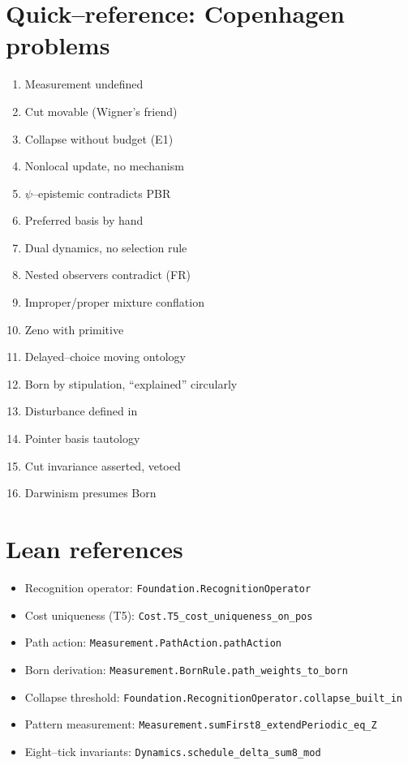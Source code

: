 \documentclass[11pt]{article}
\begin{document}
\section{Quick--reference: Copenhagen problems}

\begin{enumerate}[nosep,leftmargin=*]
  \item Measurement undefined
  \item Cut movable (Wigner's friend)
  \item Collapse without budget (E1)
  \item Nonlocal update, no mechanism
  \item $\psi$--epistemic contradicts PBR
  \item Preferred basis by hand
  \item Dual dynamics, no selection rule
  \item Nested observers contradict (FR)
  \item Improper/proper mixture conflation
  \item Zeno with primitive
  \item Delayed--choice moving ontology
  \item Born by stipulation, ``explained'' circularly
  \item Disturbance defined in
  \item Pointer basis tautology
  \item Cut invariance asserted, vetoed
  \item Darwinism presumes Born
\end{enumerate}

\section{Lean references}

\begin{itemize}[nosep]
  \item Recognition operator: \texttt{Foundation.RecognitionOperator}
  \item Cost uniqueness (T5): \texttt{Cost.T5\_cost\_uniqueness\_on\_pos}
  \item Path action: \texttt{Measurement.PathAction.pathAction}
  \item Born derivation: \texttt{Measurement.BornRule.path\_weights\_to\_born}
  \item Collapse threshold: \texttt{Foundation.RecognitionOperator.collapse\_built\_in}
  \item Pattern measurement: \texttt{Measurement.sumFirst8\_extendPeriodic\_eq\_Z}
  \item Eight--tick invariants: \texttt{Dynamics.schedule\_delta\_sum8\_mod}
\end{itemize}
\end{document}

